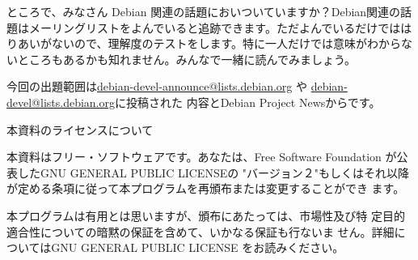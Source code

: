 \documentclass[mingoth,a4paper]{jsarticle}
\begin{document}
ところで、みなさん Debian 関連の話題においついていますか？Debian関連の話
題はメーリングリストをよんでいると追跡できます。ただよんでいるだけではは
りあいがないので、理解度のテストをします。特に一人だけでは意味がわからな
いところもあるかも知れません。みんなで一緒に読んでみましょう。

今回の出題範囲は\url{debian-devel-announce@lists.debian.org} や \url{debian-devel@lists.debian.org}に投稿された
内容とDebian Project Newsからです。

\begin{multicols}{2}



\end{multicols}

\clearpage
\begin{center}
本資料のライセンスについて
\end{center}

本資料はフリー・ソフトウェアです。あなたは、Free Software
Foundation が公表したGNU GENERAL PUBLIC LICENSEの "バージョン２"もしくはそれ以降
が定める条項に従って本プログラムを再頒布または変更することができ
ます。

本プログラムは有用とは思いますが、頒布にあたっては、市場性及び特
定目的適合性についての暗黙の保証を含めて、いかなる保証も行ないま
せん。詳細についてはGNU GENERAL PUBLIC LICENSE をお読みください。
\end{document}
